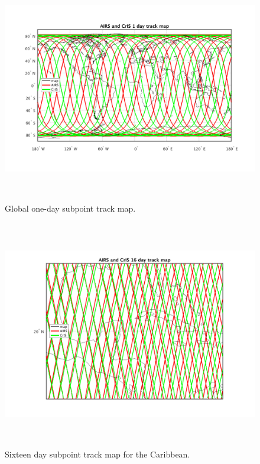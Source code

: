 \documentclass[12pt]{article}
\begin{document}
\begin{figure} %
  \centering
  \includegraphics[height=10cm]{figures/subpt_1_day_all.png}
  \vskip-12mm
  \caption{Global one-day subpoint track map.}
  \label{fig4}
\end{figure}

\begin{figure} %
  \centering
  \includegraphics[height=10cm]{figures/subpt_16_day_zoom.png}
  \vskip-9mm
  \caption{Sixteen day subpoint track map for the Caribbean.}
  \label{fig5}
\end{figure}
\end{document}
